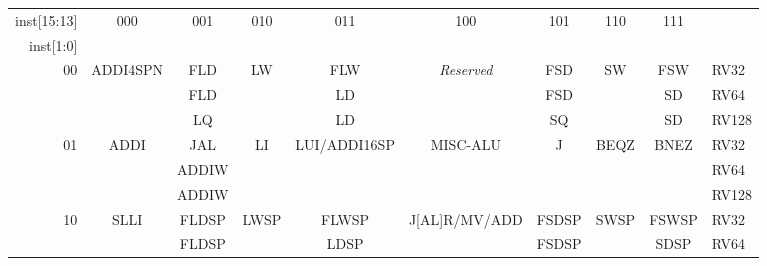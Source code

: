 \vspace{0.1in}
\begin{table*}[htbp]
\begin{center}
{\footnotesize
\setlength{\tabcolsep}{4pt}
\begin{tabular}{|r|c|c|c|c|c|c|c|c|l}
  \cline{1-9}
  inst[15:13] & \multirow{2}{*}{000}& \multirow{2}{*}{001}& \multirow{2}{*}{010}& \multirow{2}{*}{011}& \multirow{2}{*}{100}& \multirow{2}{*}{101}& \multirow{2}{*}{110}& \multirow{2}{*}{111}\\ \cline{1-1}
  inst[1:0] & & & & & & & & \\ \cline{1-9}
    \multirow{3}{*}{00} & \multirow{3}{*}{ADDI4SPN} & FLD   & \multirow{3}{*}{LW}   & FLW                           & \multirow{3}{*}{\em Reserved}  & FSD                & \multirow{3}{*}{SW}   & FSW                   & RV32  \\
                        &                           & FLD   &                       & LD                            &                                & FSD                &                       & SD                    & RV64  \\
                        &                           & LQ    &                       & LD                            &                                & SQ                 &                       & SD                    & RV128 \\ \hline
    \multirow{3}{*}{01} & \multirow{3}{*}{ADDI}     & JAL   & \multirow{3}{*}{LI}   & \multirow{3}{*}{LUI/ADDI16SP} & \multirow{3}{*}{MISC-ALU}      & \multirow{3}{*}{J} & \multirow{3}{*}{BEQZ} & \multirow{3}{*}{BNEZ} & RV32  \\
                        &                           & ADDIW &                       &                               &                                &                    &                       &                       & RV64  \\
                        &                           & ADDIW &                       &                               &                                &                    &                       &                       & RV128 \\ \hline
    \multirow{3}{*}{10} & \multirow{3}{*}{SLLI}     & FLDSP & \multirow{3}{*}{LWSP} & FLWSP                         & \multirow{3}{*}{J[AL]R/MV/ADD} & FSDSP              & \multirow{3}{*}{SWSP} & FSWSP                 & RV32  \\
                        &                           & FLDSP &                       & LDSP                          &                                & FSDSP              &                       & SDSP                  & RV64  \\

\end{tabular}}
\end{center}
\end{table*}
